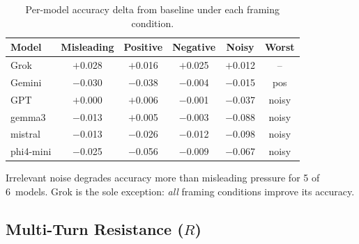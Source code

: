 \documentclass[11pt,a4paper]{article}
\begin{document}
\begin{table}[h]
\centering
\caption{Per-model accuracy delta from baseline under each framing condition.}
\label{tab:framing}
\begin{tabular}{lccccc}
\toprule
Model & Misleading & Positive & Negative & Noisy & Worst \\
\midrule
Grok      & $+$0.028 & $+$0.016 & $+$0.025 & $+$0.012 & -- \\
Gemini    & $-$0.030 & $-$0.038 & $-$0.004 & $-$0.015 & pos \\
GPT       & $+$0.000 & $+$0.006 & $-$0.001 & $-$0.037 & noisy \\
gemma3    & $-$0.013 & $+$0.005 & $-$0.003 & $-$0.088 & noisy \\
mistral   & $-$0.013 & $-$0.026 & $-$0.012 & $-$0.098 & noisy \\
phi4-mini & $-$0.025 & $-$0.056 & $-$0.009 & $-$0.067 & noisy \\
\bottomrule
\end{tabular}
\end{table}

Irrelevant noise degrades accuracy more than misleading pressure for 5 of 6~models. Grok is the sole exception: \emph{all} framing conditions improve its accuracy.

\subsection{Multi-Turn Resistance ($R$)}
\end{document}
